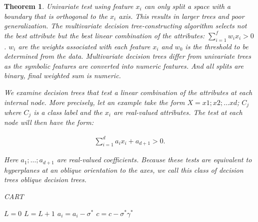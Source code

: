 \documentclass[12pt,preprint]{elsarticle}
\newtheorem{Theorem}{Theorem}
\begin{document}
\begin{Theorem}
Univariate test using feature $x_i$ can only split a space with a boundary that is orthogonal to the $x_i$ axis. This results in larger trees and poor generalization.  The  multivariate  decision  tree-constructing algorithm selects not the best attribute but the best linear  combination of the attributes: $\sum_{i=1}^f w_i x_i>0$. $w_i$ are the weights associated with each feature  $x_i$ and  $w_0$ is the threshold to be determined from the data. Multivariate decision trees  differ from  univariate trees  as the  symbolic  features  are  converted  into  numeric  features. And all splits are binary, final weighted sum is numeric.

We examine decision trees that test a linear combination of the attributes
at each internal node. More precisely, let an example take the form $X = x1; x2; \dots xd$; $C_j$
where $C_j$ is a class label and the $x_i$ are real-valued attributes. The test at each node will
then have the form:

\begin{align}
\sum_{i=1}^d a_i x_i + a_{d+1} > 0.
\end{align}

Here $a_1; \dots ; a_{d+1}$ are real-valued coefficients. Because these tests are equivalent to hyperplanes at an oblique orientation to the axes, we call this class of decision trees oblique
decision trees.

\begin{algorithm}[ht]
\caption{CART}\label{alg:cap}
\begin{algorithmic}
    \State $L = 0$
        \STATE $L=L+1$
            \ENDFOR
            \STATE $a_i=a_i-\sigma^*$
            \STATE $c=c-\sigma^* \gamma^*$
        \ENDFOR
    \ENDWHILE
\end{algorithmic}
\end{algorithm}


\end{Theorem}
\end{document}
